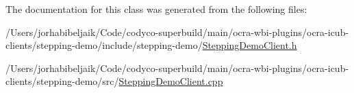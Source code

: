 The documentation for this class was generated from the following files\+:\begin{DoxyCompactItemize}
\item 
/\+Users/jorhabibeljaik/\+Code/codyco-\/superbuild/main/ocra-\/wbi-\/plugins/ocra-\/icub-\/clients/stepping-\/demo/include/stepping-\/demo/\hyperlink{SteppingDemoClient_8h}{Stepping\+Demo\+Client.\+h}\item 
/\+Users/jorhabibeljaik/\+Code/codyco-\/superbuild/main/ocra-\/wbi-\/plugins/ocra-\/icub-\/clients/stepping-\/demo/src/\hyperlink{SteppingDemoClient_8cpp}{Stepping\+Demo\+Client.\+cpp}\end{DoxyCompactItemize}

